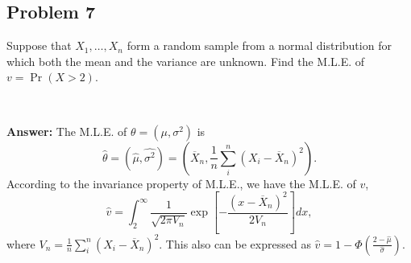 \documentclass{article}
\begin{document}
\subsection*{Problem 7}
Suppose that $X_1, \dots, X_n$ form a random sample from a normal distribution for which both the mean and the variance are unknown. Find the M.L.E. of $v = \Pr(X > 2)$.

\

\textbf{Answer:} The M.L.E. of $\theta = (\mu, \sigma^2)$ is 
\begin{equation*}
\hat{\theta} = (\hat{\mu}, \hat{\sigma^2}) = (\overline{X}_n, \frac{1}{n} \sum_i^n (X_i - \overline{X}_n)^2).
\end{equation*}
According to the invariance property of M.L.E., we have the M.L.E. of $v$,
\begin{equation*}
\hat{v} = \int_2^{\infty} \frac{1}{\sqrt{2 \pi V_n}} \exp[-\frac{(x - \overline{X}_n)^2}{2V_n}] dx,
\end{equation*}
where $V_n = \frac{1}{n} \sum_i^n (X_i - \overline{X}_n)^2$. This also can be expressed as $\hat{v} = 1 - \Phi(\frac{2 - \hat{\mu}}{\hat{\sigma}})$.
\end{document}
